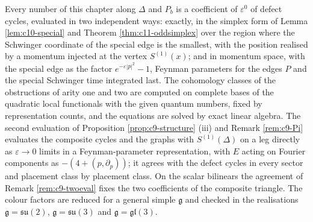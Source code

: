 \begin{remark}
\label{rem:c9-methodD}
Every number of this chapter along $\Delta$ and $P_b$ is a coefficient of $\varepsilon^0$ of defect cycles, evaluated in two independent ways: exactly, in the simplex form of Lemma \ref{lem:c10-special} and Theorem \ref{thm:c11-oddsimplex} over the region where the Schwinger coordinate of the special edge is the smallest, with the position realised by a momentum injected at the vertex $S^{(1)}(x)$; and in momentum space, with the special edge as the factor $e^{-\varepsilon|p|^2}-1$, Feynman parameters for the edges $P$ and the special Schwinger time integrated last. The cohomology classes of the obstructions of arity one and two are computed on complete bases of the quadratic local functionals with the given quantum numbers, fixed by representation counts, and the equations are solved by exact linear algebra. The second evaluation of Proposition \ref{prop:c9-structure} (iii) and Remark \ref{rem:c9-Pi} evaluates the composite cycles and the graphs with $S^{(1)}(\Delta)$ on a leg directly as $\varepsilon\to0$ limits in a Feynman-parameter representation, with $E$ acting on Fourier components as $-(4+(p,\partial_p))$; it agrees with the defect cycles in every sector and placement class by placement class. On the scalar bilinears the agreement of Remark \ref{rem:c9-twoeval} fixes the two coefficients of the composite triangle. The colour factors are reduced for a general simple $\mathfrak g$ and checked in the realisations $\mathfrak g=\mathfrak{su}(2)$, $\mathfrak g=\mathfrak{su}(3)$ and $\mathfrak g=\mathfrak{gl}(3)$.
\end{remark}

